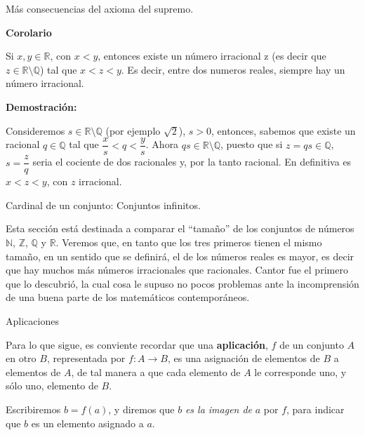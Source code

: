 \documentclass[ignorenonframetext,]{beamer}
\begin{document}
\begin{frame}{Más consecuencias del axioma del supremo.}
\protect\hypertarget{muxe1s-consecuencias-del-axioma-del-supremo.-1}{}

\textbf{Corolario}

Si \(x,y \in \mathbb{R}\), con \(x<y\), entonces existe un número
irracional z (es decir que \(z \in \mathbb{R} \setminus \mathbb{Q}\))
tal que \(x<z<y\). Es decir, entre dos numeros reales, siempre hay un
número irracional.

\textbf{Demostración:}

Consideremos \(s \in \mathbb{R} \setminus \mathbb{Q}\) (por ejemplo
\(\sqrt{2}\)), \(s>0\), entonces, sabemos que existe un racional
\(q \in \mathbb{Q}\) tal que \(\dfrac{x}{s} <q < \dfrac{y}{s}\). Ahora
\(qs \in \mathbb{R} \setminus \mathbb{Q}\), puesto que si
\(z=qs \in \mathbb{Q}\), \(s=\dfrac{z}{q}\) seria el cociente de dos
racionales y, por la tanto racional. En definitiva es \(x<z<y\), con
\(z\) irracional.

\end{frame}

\begin{frame}{Cardinal de un conjunto: Conjuntos infinitos.}
\protect\hypertarget{cardinal-de-un-conjunto-conjuntos-infinitos.}{}

Esta sección está destinada a comparar el ``tamaño'' de los conjuntos de
números \(\mathbb{N}\), \(\mathbb{Z}\), \(\mathbb{Q}\) y \(\mathbb{R}\).
Veremos que, en tanto que los tres primeros tienen el mismo tamaño, en
un sentido que se definirá, el de los números reales es mayor, es decir
que hay muchos más números irracionales que racionales. Cantor fue el
primero que lo descubrió, la cual cosa le supuso no pocos problemas ante
la incomprensión de una buena parte de los matemáticos contemporáneos.

\end{frame}

\begin{frame}{Aplicaciones}
\protect\hypertarget{aplicaciones}{}

Para lo que sigue, es conviente recordar que una \textbf{aplicación},
\(f\) de un conjunto \(A\) en otro \(B\), representada por
\(f: A \rightarrow B\), es una asignación de elementos de \(B\) a
elementos de \(A\), de tal manera a que cada elemento de \(A\) le
corresponde uno, y sólo uno, elemento de \(B\).

Escribiremos \(b=f(a)\), y diremos que \(b\) \emph{es la imagen de}
\(a\) por \(f\), para indicar que \(b\) es un elemento asignado a \(a\).

\end{frame}
\end{document}
